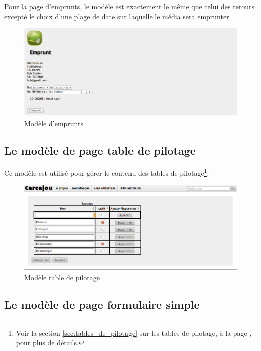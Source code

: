 \documentclass[letter, 11pt]{report}
\begin{document}
Pour la page d'emprunts, le modèle est exactement le même que celui des retours excepté le choix d'une plage de date sur laquelle le média sera emprunter.

\begin{figure}[htbp]
	\begin{center}
		\includegraphics[scale=0.25]{captures_ecran/emprunt.png}
	\end{center}
	\caption{Modèle d'emprunts}
\end{figure}

\subsection{Le modèle de page table de pilotage}

Ce modèle est utilisé pour gérer le contenu des tables de pilotage\footnote{Voir la section \ref{sec:tables_de_pilotage} sur les tables de pilotage, à la page \pageref{sec:tables_de_pilotage}, pour plus de détails.}.

\begin{figure}[htbp]
	\begin{center}
		\includegraphics[scale=0.4]{captures_ecran/modele_tables_de_pilotage.png}
	\end{center}
	\caption{Modèle table de pilotage}
\end{figure}

\subsection{Le modèle de page formulaire simple}
\end{document}
